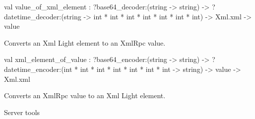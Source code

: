 \documentclass[11pt]{article}
\begin{document}
\label{val:XmlRpc.value-underscoreof-underscorexml-underscoreelement}\begin{ocamldoccode}
val value_of_xml_element :
  ?base64_decoder:(string -> string) ->
  ?datetime_decoder:(string -> int * int * int * int * int * int * int) ->
  Xml.xml -> value
\end{ocamldoccode}
\begin{ocamldocdescription}
Converts an Xml Light element to an XmlRpc value.


\end{ocamldocdescription}




\label{val:XmlRpc.xml-underscoreelement-underscoreof-underscorevalue}\begin{ocamldoccode}
val xml_element_of_value :
  ?base64_encoder:(string -> string) ->
  ?datetime_encoder:(int * int * int * int * int * int * int -> string) ->
  value -> Xml.xml
\end{ocamldoccode}
\begin{ocamldocdescription}
Converts an XmlRpc value to an Xml Light element.


\end{ocamldocdescription}




Server tools
\end{document}
